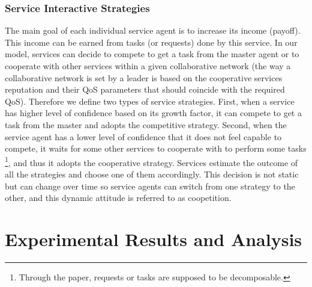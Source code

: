 %


\subsubsection{Service Interactive Strategies}

The main goal of each individual service agent is to increase its
income (payoff). This income can be earned from tasks (or
requests) done by this service. In our model, services can decide
to compete to get a task from the master agent or to cooperate
with other services within a given collaborative network (the way
a collaborative network is set by a leader is based on the
cooperative services reputation and their QoS parameters that
should coincide with the required QoS). Therefore we define two
types of service strategies. First, when a service has higher
level of confidence based on its growth factor, it can compete to
get a task from the master and adopts the competitive strategy.
Second, when the service agent has a lower level of confidence
that it does not feel capable to compete, it waits for some other
services to cooperate with to perform some tasks \footnote{Through
the paper, requests or tasks are supposed to be decomposable.},
and thus it adopts the cooperative strategy. Services estimate the
outcome of all the strategies and choose one of them accordingly.
This decision is not static but can change over time so service
agents can switch from one strategy to the other, and this dynamic
attitude is referred to as coopetition.











\section{Experimental Results and Analysis}\label{s:resutls}

